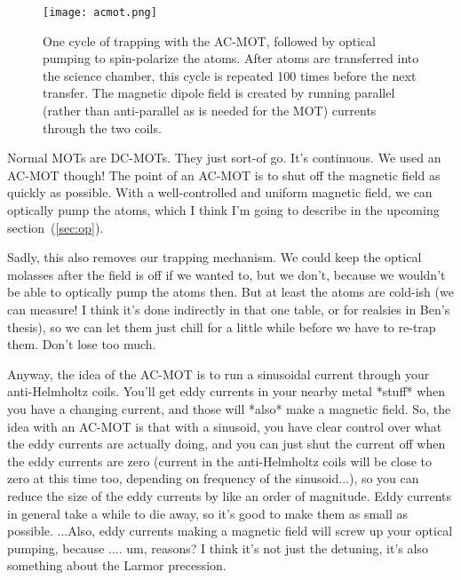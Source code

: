 \begin{figure}[ht]
	\centering
		\texttt{[image: acmot.png]}
		\caption{One cycle of trapping with the AC-MOT, followed by optical pumping to spin-polarize the atoms.  After atoms are transferred into the science chamber, this cycle is repeated 100 times before the next transfer.  The magnetic dipole field is created by running parallel (rather than anti-parallel as is needed for the MOT) currents through the two coils.}
		\label{fig:acmot}
\end{figure}


Normal MOTs are DC-MOTs.  They just sort-of go.  It's continuous.  We used an AC-MOT though!  The point of an AC-MOT is to shut off the magnetic field as quickly as possible.  With a well-controlled and uniform magnetic field, we can optically pump the atoms, which I think I'm going to describe in the upcoming section~(\ref{sec:op}).

Sadly, this also removes our trapping mechanism.  We could keep the optical molasses after the field is off if we wanted to, but we don't, because we wouldn't be able to optically pump the atoms then.  But at least the atoms are cold-ish (we can measure!  I think it's done indirectly in that one table, or for realsies in Ben's thesis), so we can let them just chill for a little while before we have to re-trap them.  Don't lose too much.  

Anyway, the idea of the AC-MOT is to run a sinusoidal current through your anti-Helmholtz coils.  You'll get eddy currents in your nearby metal *stuff* when you have a changing current, and those will *also* make a magnetic field. So, the idea with an AC-MOT is that with a sinusoid, you have clear control over what the eddy currents are actually doing, and you can just shut the current off when the eddy currents are zero (current in the anti-Helmholtz coils will be close to zero at this time too, depending on frequency of the sinusoid...), so you can reduce the size of the eddy currents by like an order of magnitude.  Eddy currents in general take a while to die away, so it's good to make them as small as possible.  ...Also, eddy currents making a magnetic field will screw up your optical pumping, because .... um, reasons?  I think it's not just the detuning, it's also something about the Larmor precession.  


